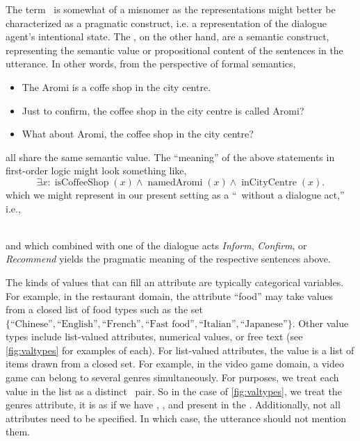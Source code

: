 The term \meaningrepresentation~is somewhat of a misnomer as the
representations might better be characterized as a pragmatic construct, i.e. a
representation of the dialogue agent's intentional state.  The
\attributevalues, on the other hand, are a semantic construct, representing the
semantic value or propositional content of the sentences in the utterance. In
other words, from the perspective of formal semantics, \begin{itemize} 
    \item The Aromi is a coffe shop in the city centre.  \item Just to
    confirm, the coffee shop in the city centre is called Aromi?  \item What
about Aromi, the coffee shop in the city centre?  \end{itemize} \noindent all
share the same semantic value. The ``meaning'' of the above statements
in first-order logic might look something like, \[\exists x :
\operatorname{isCoffeeShop}(x) \wedge \operatorname{namedAromi}(x) \wedge
\operatorname{inCityCentre}(x).\] which we might represent in our present
setting as a ``\meaningrepresentation~without a dialogue act,'' i.e.,
\begin{center}  \end{center} ~\\
    
    \noindent and which combined with one of the dialogue acts
    \textit{Inform}, \textit{Confirm},
    or \textit{Recommend} yields the pragmatic meaning of the respective sentences above.



The kinds of values that can fill an attribute are typically categorical
variables. For example, in the restaurant domain, the attribute ``food'' may
take values from a closed list of food types such as the set
$\{\textrm{``Chinese''}, \textrm{``English''}, \textrm{``French''},
\textrm{``Fast food''}, \textrm{``Italian''}, \textrm{``Japanese''}\}$. Other
value types include list-valued attributes, numerical values, or free text (see
\autoref{fig:valtypes} for examples of each). For list-valued attributes, the
value is a list of items drawn from a closed set.  For example, in the video
game domain, a video game can belong to several genres simultaneously.
For purposes, we treat each value in the 
list as a distinct \attributevalue~pair. So in the case of \autoref{fig:valtypes},
we treat the genres attribute, it is as if we have , 
, and  present in the \meaningrepresentation.
Additionally, not all attributes need to be specified. In which case, the
utterance should not mention them.

